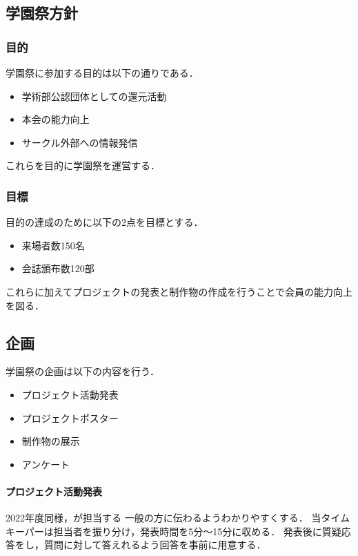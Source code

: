 \subsection*{学園祭方針}


\subsubsection*{目的}
学園祭に参加する目的は以下の通りである．
\begin{itemize}
    \item 学術部公認団体としての還元活動
    \item 本会の能力向上
    \item サークル外部への情報発信
\end{itemize}
これらを目的に学園祭を運営する．

\subsubsection*{目標}
目的の達成のために以下の2点を目標とする．
\begin{itemize}
    \item 来場者数150名
    \item 会誌頒布数120部
\end{itemize}
これらに加えてプロジェクトの発表と制作物の作成を行うことで会員の能力向上を図る．

\subsection*{企画}
学園祭の企画は以下の内容を行う．
\begin{itemize}
    \item プロジェクト活動発表
    \item プロジェクトポスター
    \item 制作物の展示
    \item アンケート
\end{itemize}

\paragraph{プロジェクト活動発表}
2022年度同様\firstGrade{}，\secondGrade{}が担当する
一般の方に伝わるようわかりやすくする．
当タイムキーパーは担当者を振り分け，発表時間を5分～15分に収める．
発表後に質疑応答をし，質問に対して答えれるよう回答を事前に用意する．  

